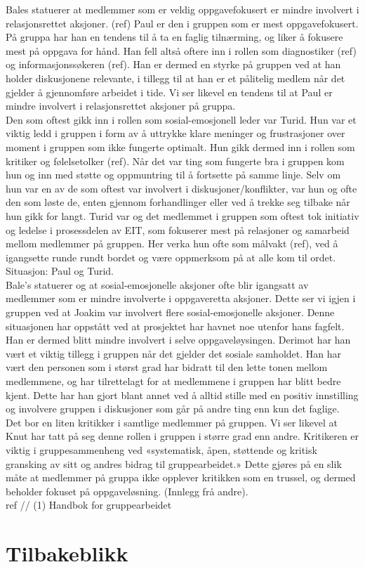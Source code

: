 Bales statuerer at medlemmer som er veldig oppgavefokusert er mindre involvert i relasjonsrettet aksjoner. (ref) Paul er den i gruppen som er mest oppgavefokusert. På gruppa har han en tendens til å ta en faglig tilnærming, og liker å fokusere mest på oppgava for hånd. Han fell altså oftere inn i rollen som diagnostiker (ref) og informasjonssøkeren (ref). Han er dermed en styrke på gruppen ved at han holder diskusjonene relevante, i tillegg til at han er et pålitelig medlem når det gjelder å gjennomføre arbeidet i tide. Vi ser likevel en tendens til at Paul er mindre involvert i relasjonsrettet aksjoner på gruppa. \\
Den som oftest gikk inn i rollen som sosial-emosjonell leder var Turid. Hun var et viktig ledd i gruppen i form av å uttrykke klare meninger og frustrasjoner over moment i gruppen som ikke fungerte optimalt. Hun gikk dermed inn i rollen som kritiker og følelsetolker (ref). Når det var ting som fungerte bra i gruppen kom hun og inn med støtte og oppmuntring til å fortsette på samme linje. Selv om hun var en av de som oftest var involvert i diskusjoner/konflikter, var hun og ofte den som løste de, enten gjennom forhandlinger eller ved å trekke seg tilbake når hun gikk for langt. Turid var og det medlemmet i gruppen som oftest tok initiativ og ledelse i prosessdelen av EIT, som fokuserer mest på relasjoner og samarbeid mellom medlemmer på gruppen. Her verka hun ofte som målvakt (ref), ved å igangsette runde rundt bordet og være oppmerksom på at alle kom til ordet.
Situasjon: Paul og Turid.\\

Bale's statuerer og at sosial-emosjonelle aksjoner ofte blir igangsatt av medlemmer som er mindre involverte i oppgaveretta aksjoner. Dette ser vi igjen i gruppen ved at Joakim var involvert flere sosial-emosjonelle aksjoner. Denne situasjonen har oppstått ved at prosjektet har havnet noe utenfor hans fagfelt. Han er dermed blitt mindre involvert i selve oppgaveløysingen. Derimot har han vært et viktig tillegg i gruppen når det gjelder det sosiale samholdet. Han har vært den personen som i størst grad har bidratt til den lette tonen mellom medlemmene, og har tilrettelagt for at medlemmene i gruppen har blitt bedre kjent. Dette har han gjort blant annet ved å alltid stille med en positiv innstilling og involvere gruppen i diskusjoner som går på andre ting enn kun det faglige.\\

Det bor en liten kritikker i samtlige medlemmer på gruppen. Vi ser likevel at Knut har tatt på seg denne rollen i gruppen i større grad enn andre. Kritikeren er viktig i gruppesammenheng ved «systematisk, åpen, støttende og kritisk gransking av sitt og andres bidrag til gruppearbeidet.»
Dette gjøres på en slik måte at medlemmer på gruppa ikke opplever kritikken som en trussel, og dermed beholder fokuset på oppgaveløsning. (Innlegg frå andre).\\

ref // (1) Handbok for gruppearbeidet\\

\section{Tilbakeblikk}

